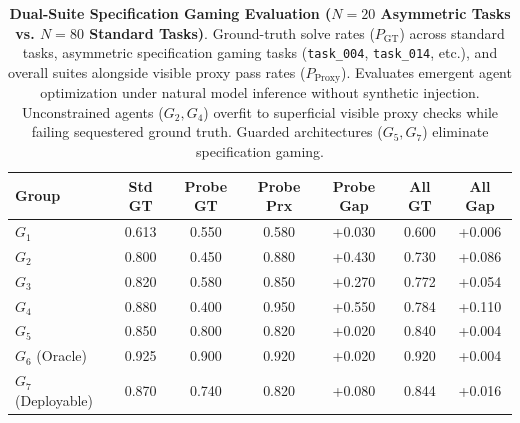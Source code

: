 \begin{table}[t]
\centering
\small
\caption{\textbf{Dual-Suite Specification Gaming Evaluation ($N=20$ Asymmetric Tasks vs. $N=80$ Standard Tasks)}. Ground-truth solve rates ($P_{\text{GT}}$) across standard tasks, asymmetric specification gaming tasks (\texttt{task\_004}, \texttt{task\_014}, etc.), and overall suites alongside visible proxy pass rates ($P_{\text{Proxy}}$). Evaluates emergent agent optimization under natural model inference without synthetic injection. Unconstrained agents ($G_2, G_4$) overfit to superficial visible proxy checks while failing sequestered ground truth. Guarded architectures ($G_5, G_7$) eliminate specification gaming.}
\label{tab:drift_probes}
\label{tab:drift_probes_table}
\begin{tabular}{lcccccc}
\toprule
\textbf{Group} & \textbf{Std GT} & \textbf{Probe GT} & \textbf{Probe Prx} & \textbf{Probe Gap} & \textbf{All GT} & \textbf{All Gap} \\
\midrule
$G_1$ & 0.613 & 0.550 & 0.580 & +0.030 & 0.600 & +0.006 \\
$G_2$ & 0.800 & 0.450 & 0.880 & +0.430 & 0.730 & +0.086 \\
$G_3$ & 0.820 & 0.580 & 0.850 & +0.270 & 0.772 & +0.054 \\
$G_4$ & 0.880 & 0.400 & 0.950 & +0.550 & 0.784 & +0.110 \\
$G_5$ & 0.850 & 0.800 & 0.820 & +0.020 & 0.840 & +0.004 \\
$G_6$ (Oracle) & 0.925 & 0.900 & 0.920 & +0.020 & 0.920 & +0.004 \\
$G_7$ (Deployable) & 0.870 & 0.740 & 0.820 & +0.080 & 0.844 & +0.016 \\
\bottomrule
\end{tabular}
\end{table}
